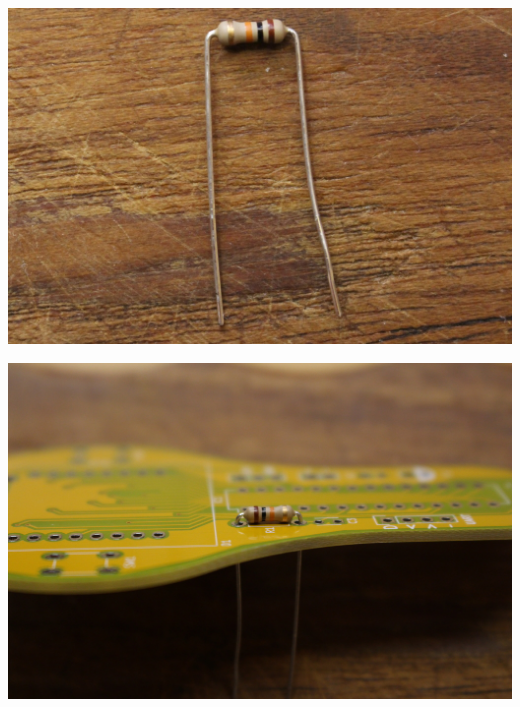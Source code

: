 \documentclass{article}
\begin{document}
\begin{minipage}[b]{0.5\textwidth}
	\includegraphics[width=\textwidth]{Bilder/IMG_5538.JPG}
\end{minipage}
\begin{minipage}[b]{0.5\textwidth}
	\includegraphics[width=\textwidth]{Bilder/IMG_5539.JPG}
\end{minipage}

\vspace{0.5cm}
\end{document}
